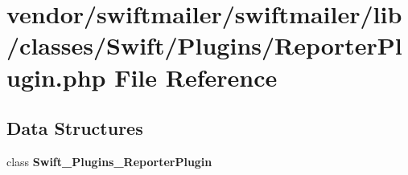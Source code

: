 \section{vendor/swiftmailer/swiftmailer/lib/classes/\+Swift/\+Plugins/\+Reporter\+Plugin.php File Reference}
\label{_reporter_plugin_8php}
\subsection*{Data Structures}
\begin{DoxyCompactItemize}
\item 
class {\bf Swift\+\_\+\+Plugins\+\_\+\+Reporter\+Plugin}
\end{DoxyCompactItemize}

